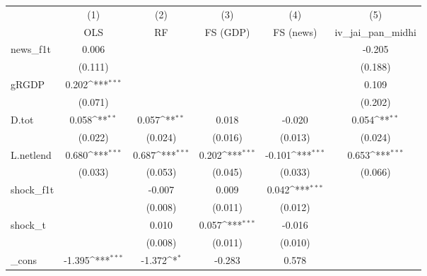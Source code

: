 {
\def\sym#1{\ifmmode^{#1}\else\(^{#1}\)\fi}
\begin{tabular}{l*{5}{c}}
\toprule
            &\multicolumn{1}{c}{(1)}&\multicolumn{1}{c}{(2)}&\multicolumn{1}{c}{(3)}&\multicolumn{1}{c}{(4)}&\multicolumn{1}{c}{(5)}\\
            &\multicolumn{1}{c}{OLS}&\multicolumn{1}{c}{RF}&\multicolumn{1}{c}{FS (GDP)}&\multicolumn{1}{c}{FS (news)}&\multicolumn{1}{c}{iv\_jai\_pan\_midhi}\\
\midrule
news\_f1t    &       0.006         &                     &                     &                     &      -0.205         \\
            &     (0.111)         &                     &                     &                     &     (0.188)         \\
\addlinespace
gRGDP       &       0.202\sym{***}&                     &                     &                     &       0.109         \\
            &     (0.071)         &                     &                     &                     &     (0.202)         \\
\addlinespace
D.tot       &       0.058\sym{**} &       0.057\sym{**} &       0.018         &      -0.020         &       0.054\sym{**} \\
            &     (0.022)         &     (0.024)         &     (0.016)         &     (0.013)         &     (0.024)         \\
\addlinespace
L.netlend   &       0.680\sym{***}&       0.687\sym{***}&       0.202\sym{***}&      -0.101\sym{***}&       0.653\sym{***}\\
            &     (0.033)         &     (0.053)         &     (0.045)         &     (0.033)         &     (0.066)         \\
\addlinespace
shock\_f1t   &                     &      -0.007         &       0.009         &       0.042\sym{***}&                     \\
            &                     &     (0.008)         &     (0.011)         &     (0.012)         &                     \\
\addlinespace
shock\_t     &                     &       0.010         &       0.057\sym{***}&      -0.016         &                     \\
            &                     &     (0.008)         &     (0.011)         &     (0.010)         &                     \\
\addlinespace
\_cons      &      -1.395\sym{***}&      -1.372\sym{*}  &      -0.283         &       0.578         &                     \\

\end{tabular}}
